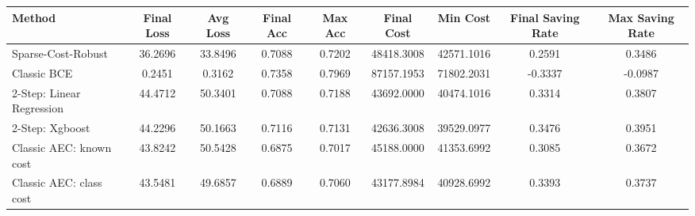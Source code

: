 \begin{tabular}{lcccccccc}
\toprule
Method & Final Loss & Avg Loss & Final Acc & Max Acc & Final Cost & Min Cost & Final Saving Rate & Max Saving Rate \\
\midrule
Sparse-Cost-Robust & 36.2696 & 33.8496 & 0.7088 & 0.7202 & 48418.3008 & 42571.1016 & 0.2591 & 0.3486 \\
Classic BCE & 0.2451 & 0.3162 & 0.7358 & 0.7969 & 87157.1953 & 71802.2031 & -0.3337 & -0.0987 \\
2-Step: Linear Regression & 44.4712 & 50.3401 & 0.7088 & 0.7188 & 43692.0000 & 40474.1016 & 0.3314 & 0.3807 \\
2-Step: Xgboost & 44.2296 & 50.1663 & 0.7116 & 0.7131 & 42636.3008 & 39529.0977 & 0.3476 & 0.3951 \\
Classic AEC: known cost & 43.8242 & 50.5428 & 0.6875 & 0.7017 & 45188.0000 & 41353.6992 & 0.3085 & 0.3672 \\
Classic AEC: class cost & 43.5481 & 49.6857 & 0.6889 & 0.7060 & 43177.8984 & 40928.6992 & 0.3393 & 0.3737 \\
\bottomrule
\end{tabular}

